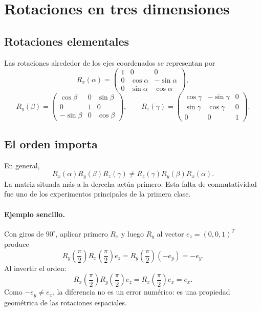 \section{Rotaciones en tres dimensiones}\label{sec:rot-3d}

{\small\vspace{1mm}\par}


\subsection{Rotaciones elementales}

Las rotaciones alrededor de los ejes coordenados se representan por
\[
R_x(\alpha)=
\begin{pmatrix}
1&0&0\\0&\cos\alpha&-\sin\alpha\\0&\sin\alpha&\cos\alpha
\end{pmatrix},
\]
\[
R_y(\beta)=
\begin{pmatrix}
\cos\beta&0&\sin\beta\\0&1&0\\-\sin\beta&0&\cos\beta
\end{pmatrix},
\qquad
R_z(\gamma)=
\begin{pmatrix}
\cos\gamma&-\sin\gamma&0\\
\sin\gamma& \cos\gamma&0\\
0&0&1
\end{pmatrix}.
\]

\subsection{El orden importa}\label{sec:orden-importa}

En general,
\[
  R_x(\alpha)R_y(\beta)R_z(\gamma)
  \neq
  R_z(\gamma)R_y(\beta)R_x(\alpha).
\]
La matriz situada más a la derecha actúa primero. Esta falta de conmutatividad fue uno de los
experimentos principales de la primera clase.

\paragraph{Ejemplo sencillo.}
Con giros de \(90^\circ\), aplicar primero \(R_x\) y luego \(R_y\) al vector
\(e_z=(0,0,1)^T\) produce
\[
R_y\left(\frac{\pi}{2}\right)
R_x\left(\frac{\pi}{2}\right)e_z
=R_y\left(\frac{\pi}{2}\right)(-e_y)
=-e_y.
\]
Al invertir el orden:
\[
R_x\left(\frac{\pi}{2}\right)
R_y\left(\frac{\pi}{2}\right)e_z
=R_x\left(\frac{\pi}{2}\right)e_x
=e_x.
\]
Como \(-e_y\neq e_x\), la diferencia no es un error numérico: es una propiedad geométrica
de las rotaciones espaciales.

